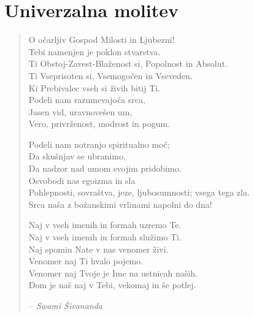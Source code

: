 




\section*{Univerzalna molitev}

\begin{verse}

O očarljiv Gospod Milosti in Ljubezni! \\
Tebi namenjen je poklon stvarstva. \\
Ti Obstoj-Zavest-Blaženost si, Popolnost in Absolut. \\
Ti Vseprisoten si, Vsemogočen in Vseveden. \\
Ki Prebivalec vseh si živih bitij Ti. \\
Podeli nam razumevajoča srca, \\
Jasen vid, uravnovešen um, \\
Vero, privrženost, modrost in pogum.

Podeli nam notranjo spiritualno moč; \\
Da skušnjav se ubranimo, \\
Da nadzor nad umom svojim pridobimo. \\
Osvobodi nas egoizma in sla \\
Pohlepnosti, sovraštva, jeze, ljubosumnosti; vsega tega zla. \\
Srca naša z božanskimi vrlinami napolni do dna!

Naj v vseh imenih in formah uzremo Te. \\
Naj v vseh imenih in formah služimo Ti. \\
Naj spomin Nate v nas venomer živi. \\
Venomer naj Ti hvalo pojemo. \\
Venomer naj Tvoje je Ime na ustnicah naših. \\
Dom je naš naj v Tebi, vekomaj in še potlej.

\vspace{1em} 

\hspace{2em} \emph{-- Swami Šivananda}
\end{verse}
